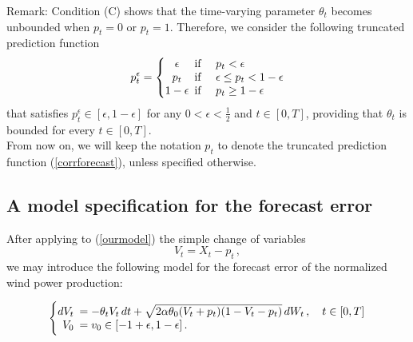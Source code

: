 \documentclass[11pt]{article}
\theoremstyle{definition}
\begin{document}
Remark: Condition (C) shows that the time-varying parameter $\theta_t$ becomes unbounded when $p_t = 0$ or $p_t = 1$. Therefore, we consider the following truncated prediction function
\begin{equation}
  p_t^{\epsilon} = \left\{
  \begin{array}{@{}cl@{}}
    \epsilon \!\!\!&\text{if \quad} p_t  < \epsilon  \\
    p_t  \!\!\!&\text{if \quad}  \epsilon \leq p_t < 1 - \epsilon \\
    1 - \epsilon  \!\!\!&\text{if \quad}  p_t \geq 1 - \epsilon
 \end{array}\right.  \label{corrforecast}
\end{equation}
that satisfies $p_t^{\epsilon} \in [\epsilon, 1 - \epsilon]$ for any $0 < \epsilon < \frac{1}{2}$ and $t \in [0,T]$, providing that $\theta_t$ is bounded for every $t \in [0,T]$. \\
From now on, we will keep the notation $p_t$ to denote the truncated prediction function (\ref{corrforecast}), unless specified otherwise.



\subsection{A model specification for the forecast error}
 After applying to (\ref{ourmodel}) the simple change of variables $$V_t = X_t - p_t \,,$$ we may introduce the following model for the forecast error of the normalized wind power production: 

\begin{equation}
  \left\{
  \begin{array}{@{}rl@{}}
    dV_t \!\!\!&=  - \theta_t V_t  \, dt + \sqrt{2 \alpha \theta_0 (V_t +p_t ) (1-V_t-p_t)} \, dW_t\,, \quad t \in [0,T]  \\
   V_0  \!\!\!&=  v_0\in [-1 + \epsilon,1 - \epsilon] \,.
 \end{array}\right.  \label{VtSDE}
\end{equation}
\end{document}
